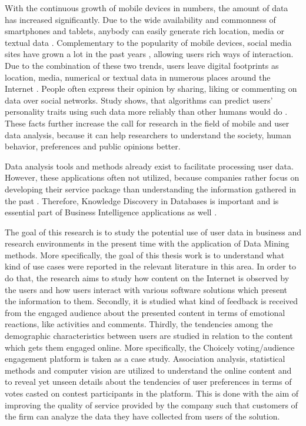     With the continuous growth of mobile devices in numbers, the amount of data has increased significantly. Due to the wide availability and commonness of smartphones and tablets, anybody can easily generate rich location, media or textual data \cite{jang2016teensengagemorewithfewerphotos}. Complementary to the popularity of mobile devices, social media sites have grown a lot in the past years \cite{hu2014we, ottoni2013ladies, bakhshi2014faces}, allowing users rich ways of interaction. Due to the combination of these two trends, users leave digital footprints as location, media, numerical or textual data in numerous places around the Internet \cite{youyou2015computer}. People often express their opinion by sharing, liking or commenting on data over social networks. Study shows, that algorithms can predict users' personality traits using such data more reliably than other humans would do \cite{youyou2015computer}. These facts further increase the call for research in the field of mobile and user data analysis, because it can help researchers to understand the society, human behavior, preferences and public opinions better.

    Data analysis tools and methods already exist to facilitate processing user data. However, these applications often not utilized, because companies rather focus on developing their service package than understanding the information gathered in the past \cite{bigdatamanagementrevolution, inmon2007tapping}. Therefore, Knowledge Discovery in Databases is important and is essential part of Business Intelligence applications as well \cite{bigdatamanagementrevolution, zarsky2002mine}.
    
    The goal of this research is to study the potential use of user data in business and research environments in the present time with the application of Data Mining methods. More specifically, the goal of this thesis work is to understand what kind of use cases were reported in the relevant literature in this area. In order to do that, the research aims to study how content on the Internet is observed by the users and how users interact with various software solutions which present the information to them. Secondly, it is studied what kind of feedback is received from the engaged audience about the presented content in terms of emotional reactions, like activities and comments. Thirdly, the tendencies among the demographic characteristics between users are studied in relation to the content which gets them engaged online. More specifically, the Choicely voting/audience engagement platform is taken as a case study. Association analysis, statistical methods and computer vision are utilized to understand the online content and to reveal yet unseen details about the tendencies of user preferences in terms of votes casted on contest participants in the platform. This is done with the aim of improving the quality of service provided by the company such that customers of the firm can analyze the data they have collected from users of the solution.
    
